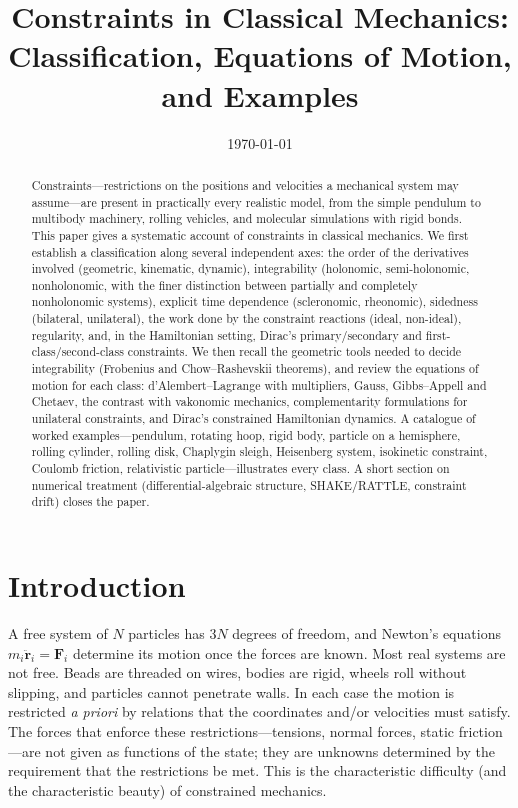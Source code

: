 \documentclass[11pt,a4paper]{article}
\title{\textbf{Constraints in Classical Mechanics:\\ Classification, Equations of Motion, and Examples}}
\author{}
\date{\today}
\theoremstyle{definition}
\theoremstyle{plain}
\theoremstyle{remark}
\begin{document}
\maketitle

\begin{abstract}
\noindent
Constraints---restrictions on the positions and velocities a mechanical system may
assume---are present in practically every realistic model, from the simple pendulum to
multibody machinery, rolling vehicles, and molecular simulations with rigid bonds. This
paper gives a systematic account of constraints in classical mechanics. We first
establish a classification along several independent axes: the order of the
derivatives involved (geometric, kinematic, dynamic), integrability (holonomic,
semi-holonomic, nonholonomic, with the finer distinction between partially and completely
nonholonomic systems), explicit time dependence (scleronomic, rheonomic), sidedness
(bilateral, unilateral), the work done by the constraint reactions (ideal, non-ideal),
regularity, and, in the Hamiltonian setting, Dirac's primary/secondary and
first-class/second-class constraints. We then recall the geometric tools needed to
decide integrability (Frobenius and Chow--Rashevskii theorems), and review the
equations of motion for each class: d'Alembert--Lagrange with multipliers, Gauss,
Gibbs--Appell and Chetaev, the contrast with vakonomic mechanics, complementarity
formulations for unilateral constraints, and Dirac's constrained Hamiltonian dynamics.
A catalogue of worked examples---pendulum, rotating hoop, rigid body, particle on a
hemisphere, rolling cylinder, rolling disk, Chaplygin sleigh, Heisenberg system, isokinetic
constraint, Coulomb friction, relativistic particle---illustrates every class. A short
section on numerical treatment (differential-algebraic structure, SHAKE/RATTLE, constraint
drift) closes the paper.
\end{abstract}

\tableofcontents
\bigskip

\section{Introduction}
A free system of $N$ particles has $3N$ degrees of freedom, and Newton's equations
$m_i\ddot{\mathbf r}_i=\mathbf F_i$ determine its motion once the forces are known.
Most real systems are not free. Beads are threaded on wires, bodies are rigid, wheels roll
without slipping, and particles cannot penetrate walls. In each case the motion is
restricted \emph{a priori} by relations that the coordinates and/or velocities must
satisfy. The forces that enforce these restrictions---tensions, normal forces, static
friction---are not given as functions of the state; they are unknowns determined by the
requirement that the restrictions be met. This is the characteristic difficulty (and
the characteristic beauty) of constrained mechanics.
\end{document}
